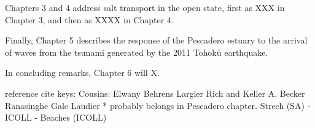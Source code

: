 Chapters 3 and 4 address salt transport in the open state, first as XXX in Chapter 3, and then as XXXX in Chapter 4. 

Finally, Chapter 5 describes the response of the Pescadero estuary to the arrival of waves from the tsunami generated by the 2011 Tohok$\overline{\mathrm{u}}$ earthquake. 

In concluding remarks, Chapter 6 will X. 











reference cite keys:
Cousins: \cite{cousins_effects_2010,cousins_hydrodynamics_2011}
Elwany \cite{elwany_opening_1998}
Behrens \cite{behrens_characterization_2009,behrens_episodic_2013}
Largier \cite{largier_structure_1986,slinger_evolution_1990,largier_circulation_1991,largier_dynamics_1991,largier_stratified_1992,largier_tidal_1992,largier_seasonally_1997}
Rich and Keller \cite{rich_hydrologic_2013}
A. Becker \cite{becker_artificial_2009}
Ranasinghe \cite{ranasinghe_flushing_1998,ranasinghe_circulation_1999,ranasinghe_morphodynamic_1999,ranasinghe_seasonal_2003}
Gale \cite{gale_vertical_2006,gale_processes_2007}
Laudier \cite{laudier_measured_2011} * probably belongs in Pescadero chapter.
Strech (SA) - \cite{stretch_breaching_2006,parkinson_breaching_2007}
ICOLL - \cite{haines_morphometric_2006,baldock_morphodynamic_2008,davidson_simple_2009}
\cite{uncles_infragravity_2014}
Beaches (ICOLL)  \cite{weir_beach_2006}







